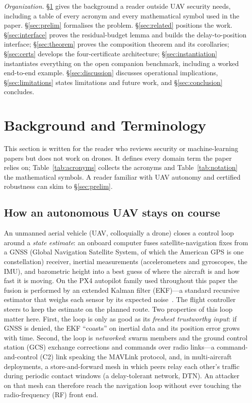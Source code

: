 \documentclass[conference]{IEEEtran}
\begin{document}
\emph{Organization.} \S\ref{sec:background} gives the background a reader
outside UAV security needs, including a table of every acronym and every
mathematical symbol used in the paper. \S\ref{sec:prelim} formalises the
problem. \S\ref{sec:related} positions the work. \S\ref{sec:interface} proves
the residual-budget lemma and builds the delay-to-position interface;
\S\ref{sec:theorem} proves the composition theorem and its corollaries;
\S\ref{sec:certs} develops the four-certificate architecture;
\S\ref{sec:instantiation} instantiates everything on the open companion
benchmark, including a worked end-to-end example. \S\ref{sec:discussion}
discusses operational implications, \S\ref{sec:limitations} states limitations
and future work, and \S\ref{sec:conclusion} concludes.

\section{Background and Terminology}
\label{sec:background}
This section is written for the reader who reviews security or machine-learning
papers but does not work on drones. It defines every domain term the paper
relies on; Table~\ref{tab:acronyms} collects the acronyms and
Table~\ref{tab:notation} the mathematical symbols. A reader familiar with UAV
autonomy and certified robustness can skim to \S\ref{sec:prelim}.

\subsection{How an autonomous UAV stays on course}
An unmanned aerial vehicle (UAV, colloquially a drone) closes a control loop
around a \emph{state estimate}: an onboard computer fuses satellite-navigation
fixes from a GNSS (Global Navigation Satellite System, of which the American
GPS is one constellation) receiver, inertial measurements (accelerometers and
gyroscopes, the IMU), and barometric height into a best guess of where the
aircraft is and how fast it is moving. On the PX4 autopilot family used
throughout this paper the fusion is performed by an extended Kalman filter
(EKF)---a standard recursive estimator that weighs each sensor by its expected
noise~\cite{kong2024px4ekf}. The flight controller steers to keep the estimate
on the planned route. Two properties of this loop matter here. First, the loop
is only as good as its \emph{freshest trustworthy input}: if GNSS is denied,
the EKF ``coasts'' on inertial data and its position error grows with time.
Second, the loop is \emph{networked}: swarm members and the ground control
station (GCS) exchange corrections and commands over radio links---a
command-and-control (C2) link speaking the MAVLink protocol, and, in
multi-aircraft deployments, a store-and-forward mesh in which peers relay each
other's traffic during periodic contact windows (a delay-tolerant network,
DTN). An attacker on that mesh can therefore reach the navigation loop without
ever touching the radio-frequency (RF) front end.
\end{document}
